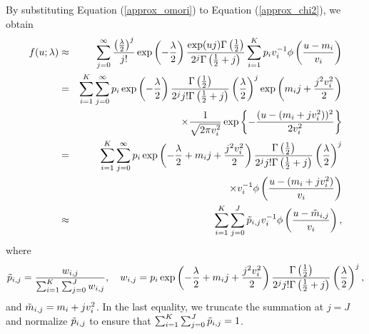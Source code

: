 By substituting Equation (\ref{approx_omori}) to Equation (\ref{approx_chi2}), we obtain
\begin{eqnarray}
    f(u; \lambda) &\approx &\sum_{j=0}^{\infty} \frac{\left(\frac{\lambda}{2}\right)^j}{j!} \exp\left(-\frac{\lambda}{2}\right) \frac{\exp(uj) \Gamma\left(\frac{1}{2}\right)}{2^j \Gamma\left(\frac{1}{2}+j\right)} \sum_{i=1}^{K} p_i v_i^{-1} \phi \left( \frac{u-m_i}{v_i} \right) 
    \nonumber \\
    &= & \sum_{i=1}^{K}  \sum_{j=0}^{\infty} p_i \exp \left(-\frac{\lambda}{2} \right) \frac{\Gamma\left(\frac{1}{2}\right)}{2^j j! \Gamma\left(\frac{1}{2} + j\right)} \left(\frac{\lambda}{2}\right)^j \exp \left( m_i j + \frac{j^2 v_i^2}{2} \right) 
    \nonumber \\
    && \hspace{3cm} \times \frac{1}{\sqrt{2 \pi v_i^2}} \exp \left\{ -\frac{(u-(m_i+j v_i^2))^2}{2 v_i^2} \right\} 
    \nonumber \\
    &=& \sum_{i=1}^{K}  \sum_{j=0}^{\infty} p_i \exp \left(-\frac{\lambda}{2} + m_i j + \frac{j^2 v_i^2}{2} \right) \frac{\Gamma\left(\frac{1}{2}\right)}{2^j j! \Gamma\left(\frac{1}{2} + j\right)} \left(\frac{\lambda}{2}\right)^j 
    \nonumber \\
    && \hspace{3cm} \times v_i^{-1} \phi \left( \frac{u-(m_i+j v_i^2)}{v_i} \right) 
    \nonumber\\
    & \approx & \sum_{i=1}^{K} \sum_{j=0}^{J} \Tilde{p}_{i,j} v_i^{-1} \phi \left( \frac{u-\Tilde{m}_{i,j}}{v_i} \right), 
    \label{approx_general_noncentral_chi2}
\end{eqnarray}
where 
\begin{equation*}
    \Tilde{p}_{i,j} = \frac{w_{i,j}}{\sum_{i=1}^{K} \sum_{j=0}^{J} w_{i,j}}, \quad
    w_{i,j} = p_i \exp \left(-\frac{\lambda}{2} + m_i j + \frac{j^2 v_i^2}{2} \right) \frac{\Gamma\left(\frac{1}{2}\right)}{2^j j! \Gamma\left(\frac{1}{2} + j\right)} \left(\frac{\lambda}{2}\right)^j,
\end{equation*}
and $\Tilde{m}_{i,j} = m_i+j v_i^2$. In the last equality, we truncate the summation at $j=J$ and normalize $\Tilde{p}_{i,j}$ to ensure that $\sum_{i=1}^{K} \sum_{j=0}^{J}  \Tilde{p}_{i,j} = 1$.

